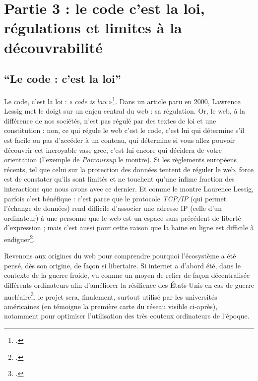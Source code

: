 

\part{Partie 3 : le code c'est la loi, régulations et limites à la découvrabilité}

\chapter*{\enquote{Le code : c'est la loi}}

Le code, c’est la loi : « \textit{code is law} »\footcite[(nous avons consulté la version française disponible sur Framablog)]{lessig_code_2000}. Dans un article paru en 2000, Lawrence Lessig met le doigt sur un enjeu central du web : sa régulation. Or, le web, à la différence de nos sociétés, n’est pas régulé par des textes de loi et une constitution : non, ce qui régule le web c’est le code, c’est lui qui détermine s’il est facile ou pas d’accéder à un contenu, qui détermine si vous allez pouvoir découvrir cet incroyable vase grec, c’est lui encore qui décidera de votre orientation (l’exemple de \textit{Parcoursup} le montre). Si les règlements européens récents, tel que celui sur la protection des données tentent de réguler le web, force est de constater qu’ils sont limités et ne touchent qu’une infime fraction des interactions que nous avons avec ce dernier. Et comme le montre Laurence Lessig, parfois c’est bénéfique : c’est parce que le protocole \textit{TCP/IP} (qui permet l’échange de données) rend difficile d’associer une adresse IP (celle d’un ordinateur) à une personne que le web est un espace sans précédent de liberté d’expression ; mais c’est aussi pour cette raison que la haine en ligne est difficile à endiguer\footcite[§8 et § 9]{lessig_code_2000}.

Revenons aux origines du web pour comprendre pourquoi l’écosystème a été pensé, dès son origine, de façon si libertaire. Si internet a d’abord été, dans le contexte de la guerre froide, vu comme un moyen de relier de façon décentralisée différents ordinateurs afin d’améliorer la résilience des États-Unis en cas de guerre nucléaire\footcite{2024i}, le projet sera, finalement, surtout utilisé par les universités américaines (en témoigne la première carte du réseau visible ci-après), notamment pour optimiser l’utilisation des très couteux ordinateurs de l’époque.


